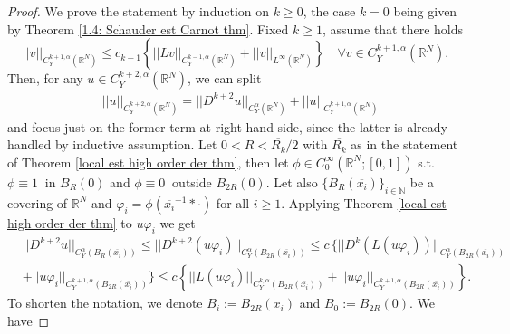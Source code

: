 \documentclass{article}
\numberwithin{equation}{section}
\begin{document}
\vspace{2mm}

\begin{proof}
We prove the statement by induction on $k \geq 0$, the case $k=0$ being given by Theorem \ref{1.4: Schauder est Carnot thm}. Fixed $k \geq 1$, assume that there holds
\begin{equation*}
    ||v||_{C^{k+1,\alpha}_Y(\mathbb{R}^N)} \leq c_{k-1} \left\{ ||Lv||_{C^{k-1,\alpha}_Y(\mathbb{R}^N)} + ||v||_{L^{\infty}(\mathbb{R}^N)} \right\} \quad \forall v \in C^{k+1,\alpha}_Y(\mathbb{R}^N).
\end{equation*}
Then, for any $u \in C^{k+2,\alpha}_Y(\mathbb{R}^N)$, we can split
    \begin{align}
        & \label{split of the k+2 Hölder norm}||u||_{C^{k+2,\alpha}_Y(\mathbb{R}^N)} = ||D^{k+2} u||_{C^{\alpha}_Y(\mathbb{R}^N)} + ||u||_{C^{k+1,\alpha}_Y(\mathbb{R}^N)}
    \end{align}
    and focus just on the former term at right-hand side, since the latter is already handled by inductive assumption. Let $0<R<\overline{R_k}/2$ with $\overline{R_k}$ as in the statement of Theorem \ref{local est high order der thm}, then let $\phi \in C^{\infty}_{0}(\mathbb{R}^N; [0,1])$ s.t. $\phi \equiv 1 \:$ in $B_R(0)$ and $\phi \equiv 0 \:$ outside $B_{2R}(0)$.
    Let also $\{B_R(\overline{x_i})\}_{i \in \mathbb{N}}$ be a covering of $\mathbb{R}^N$ and $\varphi_i=\phi(\overline{x_i}^{-1} * \cdot)$ for all $i \geq 1$. Applying Theorem \ref{local est high order der thm} to $u \varphi_i$ we get 
    \begin{align}
        & ||D^{k+2} u||_{C^{\alpha}_Y(B_R(\overline{x_i}))} \leq  ||D^{k+2}(u \varphi_i)||_{C^{\alpha}_Y(B_{2R}(\overline{x_i}))} \leq c \, \{||D^{k} (L(u \varphi_i))||_{C^{\alpha}_Y(B_{2R}(\overline{x_i}))} \nonumber\\
        & \label{control for C^k-1 norm u} + ||u \varphi_i||_{C^{k+1,\alpha}_Y(B_{2R}(\overline{x_i}))} \} \leq c \left\{||L(u \varphi_i)||_{C^{k,\alpha}_Y(B_{2R}(\overline{x_i}))} + ||u \varphi_i||_{C^{k+1,\alpha}_Y(B_{2R}(\overline{x_i}))} \right\}.
    \end{align}
    To shorten the notation, we denote $B_i:=B_{2R}(\overline{x_i})$ and $B_0:=B_{2R}(0)$. We have 

\end{proof}
\end{document}
